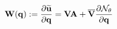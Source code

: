 \documentclass[preview]{standalone}
\begin{document}
\begin{align*}
\special{dvisvgm:raw <g id='unique000'>}\mathbf W(\mathbf q):=\frac{\partial\widetilde{\mathbf u}}{\partial\mathbf q} \special{dvisvgm:raw </g>}\special{dvisvgm:raw <g id='unique001'>}=\mathbf V\mathbf A+\overline{\mathbf V}\frac{\partial\mathcal N_\theta}{\partial\mathbf q}\special{dvisvgm:raw </g>}
\end{align*}
\end{document}
